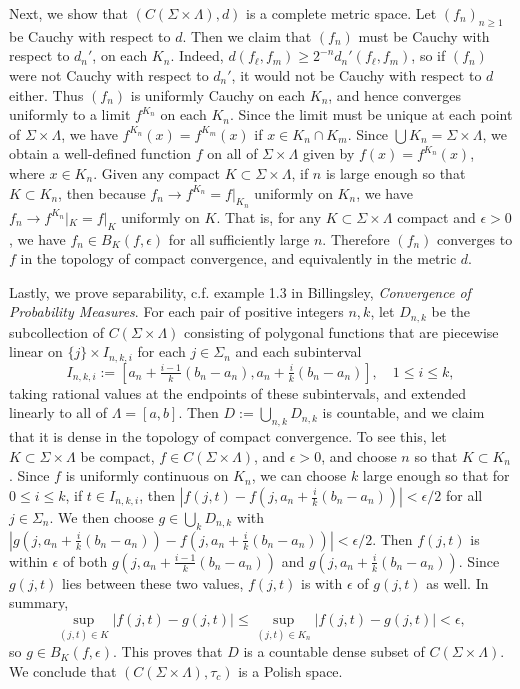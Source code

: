 \documentclass[12pt]{article}
\begin{document}
		Next, we show that $(C(\Sigma\times\Lambda), d)$ is a complete metric space. Let $(f_n)_{n\geq 1}$ be Cauchy with respect to $d$. Then we claim that $(f_n)$ must be Cauchy with respect to $d_n'$, on each $K_n$. Indeed, $d(f_\ell, f_m) \geq 2^{-n}d_n'(f_\ell, f_m)$, so if $(f_n)$ were not Cauchy with respect to $d_n'$, it would not be Cauchy with respect to $d$ either. Thus $(f_n)$ is uniformly Cauchy on each $K_n$, and hence converges uniformly to a limit $f^{K_n}$ on each $K_n$. Since the limit must be unique at each point of $\Sigma\times\Lambda$, we have $f^{K_n}(x) = f^{K_m}(x)$ if $x\in K_n\cap K_m$. Since $\bigcup K_n = \Sigma\times\Lambda$, we obtain a well-defined function $f$ on all of $\Sigma\times\Lambda$ given by $f(x)=f^{K_n}(x)$, where $x\in K_n$. Given any compact $K\subset \Sigma\times\Lambda$, if $n$ is large enough so that $K\subset K_n$, then because $f_n \to f^{K_n} = f|_{K_n}$ uniformly on $K_n$, we have $f_n \to f^{K_n}|_K = f|_K$ uniformly on $K$. That is, for any $K\subset\Sigma\times\Lambda$ compact and $\epsilon>0$, we have $f_n \in B_K(f,\epsilon)$ for all sufficiently large $n$. Therefore $(f_n)$ converges to $f$ in the topology of compact convergence, and equivalently in the metric $d$.
		
		Lastly, we prove separability, c.f. example 1.3 in Billingsley, \textit{Convergence of Probability Measures}. For each pair of positive integers $n,k$, let $D_{n,k}$ be the subcollection of $C(\Sigma\times\Lambda)$ consisting of polygonal functions that are piecewise linear on $\{j\}\times I_{n,k,i}$ for each $j\in\Sigma_n$ and each subinterval 
		\[
		I_{n,k,i} := [a_n+\tfrac{i-1}{k}(b_n-a_n), a_n+\tfrac{i}{k}(b_n-a_n)], \quad 1\leq i\leq k,
		\] 
		taking rational values at the endpoints of these subintervals, and extended linearly to all of $\Lambda = [a,b]$. Then $D := \bigcup_{n,k} D_{n,k}$ is countable, and we claim that it is dense in the topology of compact convergence. To see this, let $K\subset\Sigma\times\Lambda$ be compact, $f\in C(\Sigma\times\Lambda)$, and $\epsilon>0$, and choose $n$ so that $K\subset K_n$. Since $f$ is uniformly continuous on $K_n$, we can choose $k$ large enough so that for $0\leq i\leq k$, if $t\in I_{n,k,i}$, then $|f(j,t) - f(j, a_n + \frac{i}{k}(b_n-a_n))| < \epsilon/2$ for all $j\in\Sigma_n$. We then choose $g\in \bigcup_k D_{n,k}$ with $|g(j,a_n + \frac{i}{k}(b_n-a_n)) - f(j,a_n + \frac{i}{k}(b_n-a_n))| < \epsilon/2$. Then $f(j,t)$ is within $\epsilon$ of both $g(j,a_n + \frac{i-1}{k}(b_n-a_n))$ and $g(j,a_n + \frac{i}{k}(b_n-a_n))$. Since $g(j,t)$ lies between these two values, $f(j,t)$ is with $\epsilon$ of $g(j,t)$ as well. In summary,
		\[
		\sup_{(j,t)\in K} |f(j,t)-g(j,t)| \leq \sup_{(j,t)\in K_n} |f(j,t)-g(j,t)| < \epsilon,
		\] 
		so $g\in B_K(f,\epsilon)$. This proves that $D$ is a countable dense subset of $C(\Sigma\times\Lambda)$. We conclude that $(C(\Sigma\times\Lambda),\tau_c)$ is a Polish space.
		
\end{document}
